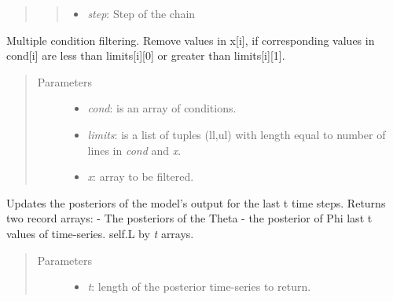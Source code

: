 \documentclass[a4paper,10pt,english]{sphinxmanual}
\begin{document}
\begin{fulllineitems}
\begin{fulllineitems}
\begin{quote}
\begin{quote}
\begin{description}
\begin{itemize}
\item {} 
\emph{step}: Step of the chain

\end{itemize}

\end{description}\end{quote}
\end{quote}

\end{fulllineitems}


\begin{fulllineitems}
\label{BIP.Bayes:BIP.Bayes.Melding.Meld.filtM}
Multiple condition filtering.
Remove values in x{[}i{]}, if corresponding values in
cond{[}i{]} are less than limits{[}i{]}{[}0{]} or greater than
limits{[}i{]}{[}1{]}.
\begin{quote}\begin{description}
\item[{Parameters}] \leavevmode\begin{itemize}
\item {} 
\emph{cond}: is an array of conditions.

\item {} 
\emph{limits}: is a list of tuples (ll,ul) with length equal to number of lines in \emph{cond} and \emph{x}.

\item {} 
\emph{x}: array to be filtered.

\end{itemize}

\end{description}\end{quote}

\end{fulllineitems}


\begin{fulllineitems}
\label{BIP.Bayes:BIP.Bayes.Melding.Meld.getPosteriors}
Updates the posteriors of the model's output for the last t time steps.
Returns two record arrays:
- The posteriors of the Theta
- the posterior of Phi last t values of time-series. self.L by \emph{t} arrays.
\begin{quote}\begin{description}
\item[{Parameters}] \leavevmode\begin{itemize}
\item {} 
\emph{t}: length of the posterior time-series to return.


\end{itemize}
\end{description}
\end{quote}
\end{fulllineitems}
\end{fulllineitems}
\end{document}
